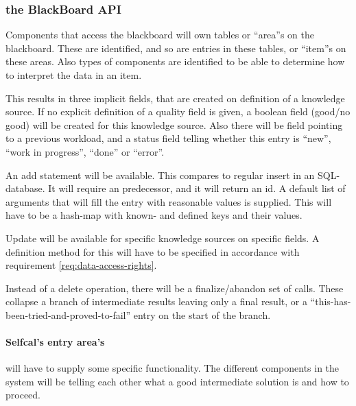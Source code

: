 \documentclass[]{lofar}
\begin{document}
      \subsubsection{the BlackBoard API}

        Components that access the blackboard will own tables or
        ``area''s on the blackboard. These are identified, and so are
        entries in these tables, or ``item''s on these areas. Also
        types of components are identified to be able to determine how
        to interpret the data in an item.

        This results in three implicit fields, that are created on
        definition of a knowledge source. If no explicit definition of
        a quality field is given, a boolean field (good/no good) will
        be created for this knowledge source. Also there will be field
        pointing to a previous workload, and a status field telling
        whether this entry is ``new'', ``work in progress'', ``done''
        or ``error''.

        An add statement will be available. This compares to regular
        insert in an SQL-database. It will require
        an predecessor, and it will return an id. A default list of
        arguments that will fill the entry with reasonable values is
        supplied. This will have to be a hash-map with known- and
        defined keys and their values.

        Update will be available for specific knowledge sources on
        specific fields. A definition method for this will have to be
        specified in accordance with requirement
        \hyperlink{req:data-access-rights}{\ref{req:data-access-rights}}.

        Instead of a delete operation, there will be a
        finalize/abandon set of calls. These collapse a branch of
        intermediate results leaving only a final result, or a
        ``this-has-been-tried-and-proved-to-fail'' entry on the start
        of the branch.

        \paragraph{Selfcal's entry area's} will have to supply some
          specific functionality. The different components in the
          system will be telling each other what a good intermediate
          solution is and how to proceed.
\end{document}
